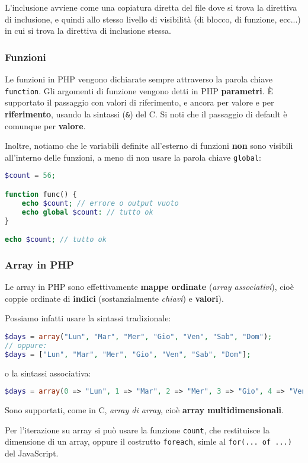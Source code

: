 \documentclass[a4paper,11pt]{article}
\begin{document}
L'inclusione avviene come una copiatura diretta del file dove si trova la direttiva di inclusione, e quindi allo stesso livello di visibilità (di blocco, di funzione, ecc...) in cui si trova la direttiva di inclusione stessa.

\subsubsection{Funzioni}
Le funzioni in PHP vengono dichiarate sempre attraverso la parola chiave \lstinline|function|.
Gli argomenti di funzione vengono detti in PHP \textbf{parametri}.
È supportato il passaggio con valori di riferimento, e ancora per valore e per \textbf{riferimento}, usando la sintassi (\lstinline|&|) del C.
Si noti che il passaggio di default è comunque per \textbf{valore}.

Inoltre, notiamo che le variabili definite all'esterno di funzioni \textbf{non} sono visibili all'interno delle funzioni, a meno di non usare la parola chiave \lstinline|global|:
\begin{lstlisting}[language=php, style=codestyle]	
$count = 56;

function func() {
	echo $count; // errore o output vuoto
	echo global $count: // tutto ok
}

echo $count; // tutto ok
\end{lstlisting}

\subsubsection{Array in PHP}
Le array in PHP sono effettivamente \textbf{mappe ordinate} (\textit{array associativi}), cioè coppie ordinate di \textbf{indici} (sostanzialmente \textit{chiavi}) e \textbf{valori}).

Possiamo infatti usare la sintassi tradizionale:
\begin{lstlisting}[language=php, style=codestyle]	
$days = array("Lun", "Mar", "Mer", "Gio", "Ven", "Sab", "Dom");
// oppure:
$days = ["Lun", "Mar", "Mer", "Gio", "Ven", "Sab", "Dom"]; 
\end{lstlisting}
o la sintassi associativa:
\begin{lstlisting}[language=php, style=codestyle]	
$days = array(0 => "Lun", 1 => "Mar", 2 => "Mer", 3 => "Gio", 4 => "Ven", 5 => "Sab", 6 => "Dom");
\end{lstlisting}

Sono supportati, come in C, \textit{array di array}, cioè \textbf{array multidimensionali}.

Per l'iterazione su array si può usare la funzione \lstinline|count|, che restituisce la dimensione di un array, oppure il costrutto \lstinline|foreach|, simle al \lstinline|for(... of ...)| del JavaScript.
\end{document}
